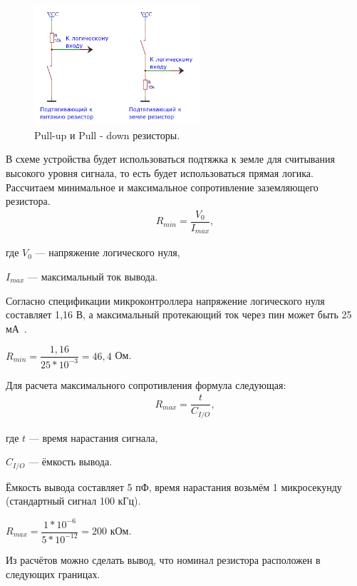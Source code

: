 	\begin{figure}[H]
    \centering
    \includegraphics[width=0.55\textwidth]{../image/res.png}
    \caption{Pull-up и Pull - down резисторы.}
	\end{figure}
	
	В схеме устройства будет использоваться подтяжка к земле для считывания высокого уровня сигнала, то есть будет использоваться прямая логика. Рассчитаем минимальное и максимальное сопротивление заземляющего резистора.
	\begin{gather}
	R_{min} = \dfrac{V_{0}}{I_{max}},
	\end{gather}
	
	где $V_{0}$ --- напряжение логического нуля,
	
	$I_{max}$ --- максимальный ток вывода.
	
	Согласно спецификации микроконтроллера напряжение логического нуля составляет 1,16 В, а максимальный протекающий ток через пин может быть 25 мА~\cite{f103}. 
	
\begin{center}
	$R_{min} = \dfrac{1,16}{25*10^{-3}} = 46,4$ Ом.
\end{center}

	Для расчета максимального сопротивления формула следующая:
	\begin{gather}
	R_{max} = \dfrac{t}{C_{I/O}},
	\end{gather}
	
	где $t$ --- время нарастания сигнала,
	
	$C_{I/O}$ --- ёмкость вывода.
	
	Ёмкость вывода составляет 5 пФ, время нарастания возьмём 1 микросекунду (стандартный сигнал 100 кГц).
	
\begin{center}
	$R_{max} = \dfrac{1*10^{-6}}{5*10^{-12}} = 200$ кОм.
\end{center}	

	Из расчётов можно сделать вывод, что номинал резистора расположен в следующих границах.
	
